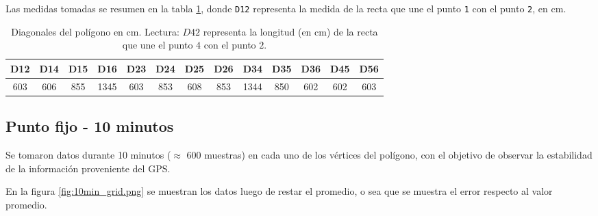 \documentclass[spanish,12pt,a4paper,titlepage]{report}
\begin{document}
Las medidas tomadas se resumen en la tabla \ref{tab:diagonales-poligono}, donde \verb+D12+ representa la medida de la recta que une el punto \verb+1+ con el punto \verb+2+, en cm.

\begin{table}[H]
\begin{center}
\begin{tabular}{|c|c|c|c|c|c|c|c|c|c|c|c|c|}
\hline
D12 & D14 & D15 & D16 & D23 & D24 & D25 & D26 & D34 & D35 & D36 & D45 & D56 \\
\hline
603 & 606 & 855 & 1345 & 603 & 853 & 608 & 853 & 1344 & 850 & 602 & 602 & 603 \\
\hline
\end{tabular}
\caption{Diagonales del polígono en cm. Lectura: $D42$ representa la longitud (en cm) de la recta que une el punto $4$ con el punto $2$.}
\label{tab:diagonales-poligono}
\end{center}
\end{table}

\newpage
\subsection{Punto fijo - 10 minutos}
\label{sec:gps2-punto-fijo-10-minutos}

Se tomaron datos durante 10 minutos ($\approx$ 600 muestras) en cada uno de los vértices del polígono, con el objetivo de observar la estabilidad de la información proveniente del GPS.

En la figura \ref{fig:10min_grid.png} se muestran los datos luego de restar el promedio, o sea que se muestra el error respecto al valor promedio.
\end{document}
